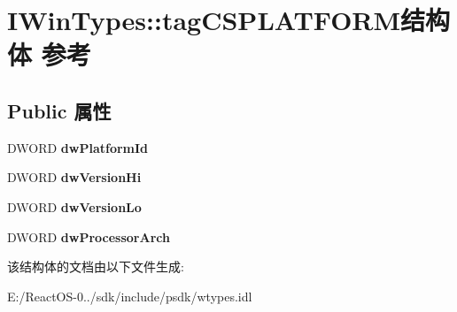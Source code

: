\hypertarget{struct_i_win_types_1_1tag_c_s_p_l_a_t_f_o_r_m}{}\section{I\+Win\+Types\+:\+:tag\+C\+S\+P\+L\+A\+T\+F\+O\+R\+M结构体 参考}
\label{struct_i_win_types_1_1tag_c_s_p_l_a_t_f_o_r_m}
\subsection*{Public 属性}
\begin{DoxyCompactItemize}
\item 
\mbox{\label{struct_i_win_types_1_1tag_c_s_p_l_a_t_f_o_r_m_ad3b0fcc9eace54bbf8bde315f440fb52}} 
D\+W\+O\+RD {\bfseries dw\+Platform\+Id}
\item 
\mbox{\label{struct_i_win_types_1_1tag_c_s_p_l_a_t_f_o_r_m_af5feb8bee4eebb031bb77da4e632828d}} 
D\+W\+O\+RD {\bfseries dw\+Version\+Hi}
\item 
\mbox{\label{struct_i_win_types_1_1tag_c_s_p_l_a_t_f_o_r_m_a8348da285e9e5f98e0748bb87e8d2ee4}} 
D\+W\+O\+RD {\bfseries dw\+Version\+Lo}
\item 
\mbox{\label{struct_i_win_types_1_1tag_c_s_p_l_a_t_f_o_r_m_a05a6220d5d081c4953a634b73bbac20f}} 
D\+W\+O\+RD {\bfseries dw\+Processor\+Arch}
\end{DoxyCompactItemize}


该结构体的文档由以下文件生成\+:\begin{DoxyCompactItemize}
\item 
E\+:/\+React\+O\+S-\/0../sdk/include/psdk/wtypes.\+idl\end{DoxyCompactItemize}
